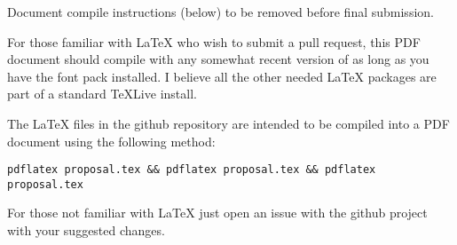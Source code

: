 Document compile instructions (below) to be removed before final submission.

For those familiar with \LaTeX{} who wish to submit a pull request, this PDF document
should compile with any somewhat recent version of
 as long as you have the
 font pack installed. I believe
all the other needed \LaTeX{} packages are part of a standard \TeX{}Live install.

The \LaTeX{} files in the github repository are intended to be compiled into a PDF document
using the following method:

\begin{verbatim}
pdflatex proposal.tex && pdflatex proposal.tex && pdflatex proposal.tex
\end{verbatim}

For those not familiar with \LaTeX{} just open an issue with the github project with your
suggested changes.

